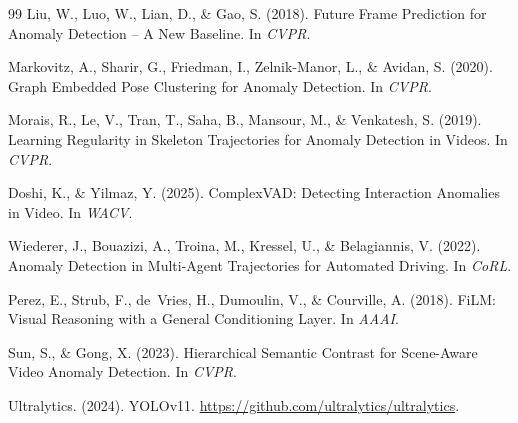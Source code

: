 \documentclass{article}
\begin{document}
\begin{thebibliography}{99}
Liu, W., Luo, W., Lian, D., \& Gao, S. (2018).
\newblock Future Frame Prediction for Anomaly Detection -- A New Baseline.
In {\em CVPR}.

Markovitz, A., Sharir, G., Friedman, I., Zelnik-Manor, L., \& Avidan, S. (2020).
\newblock Graph Embedded Pose Clustering for Anomaly Detection.
In {\em CVPR}.

Morais, R., Le, V., Tran, T., Saha, B., Mansour, M., \& Venkatesh, S. (2019).
\newblock Learning Regularity in Skeleton Trajectories for Anomaly Detection
in Videos.
In {\em CVPR}.

Doshi, K., \& Yilmaz, Y. (2025).
\newblock ComplexVAD: Detecting Interaction Anomalies in Video.
\newblock In {\em WACV}.

Wiederer, J., Bouazizi, A., Troina, M., Kressel, U., \& Belagiannis, V. (2022).
\newblock Anomaly Detection in Multi-Agent Trajectories for Automated Driving.
\newblock In {\em CoRL}.

Perez, E., Strub, F., de~Vries, H., Dumoulin, V., \& Courville, A. (2018).
\newblock FiLM: Visual Reasoning with a General Conditioning Layer.
In {\em AAAI}.

Sun, S., \& Gong, X. (2023).
\newblock Hierarchical Semantic Contrast for Scene-Aware Video Anomaly Detection.
In {\em CVPR}.

Ultralytics. (2024).
\newblock YOLOv11.
\newblock \url{https://github.com/ultralytics/ultralytics}.

\end{thebibliography}
\end{document}
